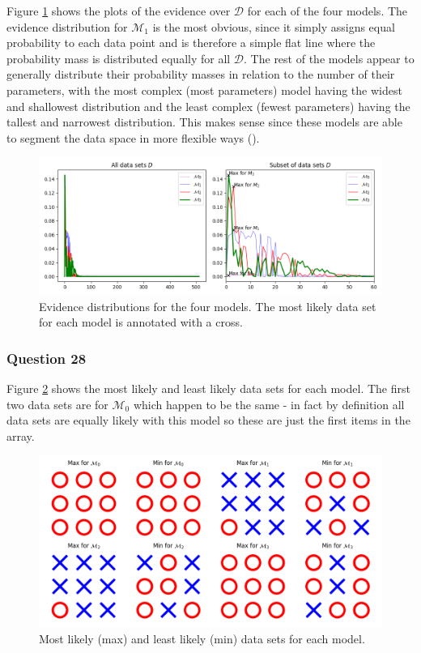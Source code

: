 \documentclass[10pt, a4paper, twocolumn]{article} %
\begin{document}
Figure \ref{fig:q27} shows the plots of the evidence over $\mathcal{D}$ for each of the four models. The evidence distribution for $\mathcal{M}_1$ is the most obvious, since it simply assigns equal probability to each data point and is therefore a simple flat line where the probability mass is distributed equally for all $\mathcal{D}$. The rest of the models appear to generally distribute their probability masses in relation to the number of their parameters, with the most complex (most parameters) model having the widest and shallowest distribution and the least complex (fewest parameters) having the tallest and narrowest distribution. This makes sense since these models are able to segment the data space in more flexible ways (\cite{github}).

\begin{figure}[htb]
\centerline{\includegraphics[width=\linewidth]{q27.png}}
\caption{Evidence distributions for the four models. The most likely data set for each model is annotated with a cross.}
\label{fig:q27}
\end{figure}

\subsubsection*{Question 28}

Figure \ref{fig:q28} shows the most likely and least likely data sets for each model. The first two data sets are for $\mathcal{M_0}$ which happen to be the same - in fact by definition all data sets are equally likely with this model so these are just the first items in the array.

\begin{figure}[htb]
\centerline{\includegraphics[width=\linewidth]{q28.png}}
\caption{Most likely (max) and least likely (min) data sets for each model.}
\label{fig:q28}
\end{figure}
\end{document}
